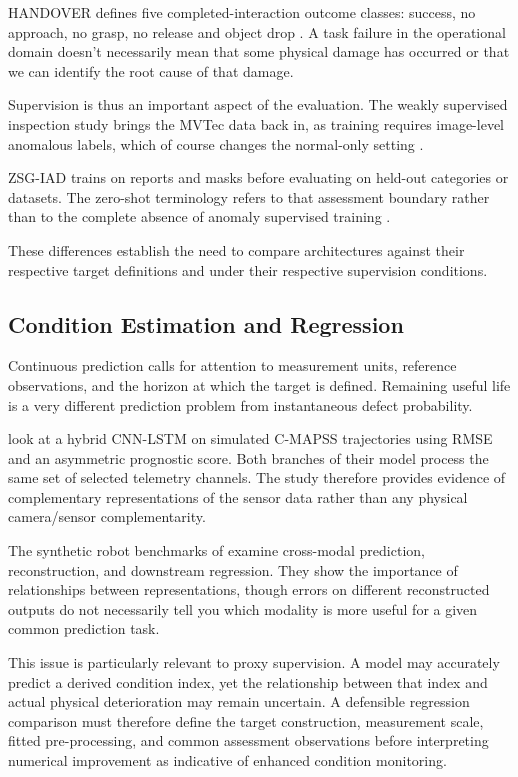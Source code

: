 HANDOVER defines five completed-interaction outcome classes: success, no approach, no grasp, no
release and object drop \parencite{thoduka_multimodal_2024}. A task failure in the operational domain
doesn't necessarily mean that some physical damage has occurred or that we can identify the root
cause of that damage.

Supervision is thus an important aspect of the evaluation. The weakly supervised inspection study
brings the MVTec data back in, as training requires image-level anomalous labels, which of course
changes the normal-only setting \parencite[p.~6659]{zhang_combined_2024}.

ZSG-IAD trains on reports and masks before evaluating on held-out categories or datasets. The
zero-shot terminology refers to that assessment boundary rather than to the complete absence of
anomaly supervised training \parencite[pp.~6, 8--9]{chen_zsg-iad_2026}.

These differences establish the need to compare architectures against their respective target
definitions and under their respective supervision conditions.

\subsection{Condition Estimation and Regression}

Continuous prediction calls for attention to measurement units, reference observations, and the
horizon at which the target is defined. Remaining useful life is a very different prediction problem
from instantaneous defect probability.

\textcite{al-dulaimi_multimodal_2019} look at a hybrid CNN-LSTM on simulated C-MAPSS trajectories using RMSE and an
asymmetric prognostic score. Both branches of their model process the same
set of selected telemetry channels. The study therefore provides evidence of complementary
representations of the sensor data rather than any physical camera/sensor complementarity.

The synthetic robot benchmarks of \textcite{altinses_performance_2025} examine cross-modal prediction,
reconstruction, and downstream regression. They show the importance
of relationships between representations, though errors on different reconstructed outputs do not
necessarily tell you which modality is more useful for a given common prediction task.

This issue is particularly relevant to proxy supervision. A model may accurately predict a derived
condition index, yet the relationship between that index and actual physical deterioration may
remain uncertain. A defensible regression comparison must therefore define the target construction,
measurement scale, fitted pre-processing, and common assessment observations before interpreting
numerical improvement as indicative of enhanced condition monitoring.

